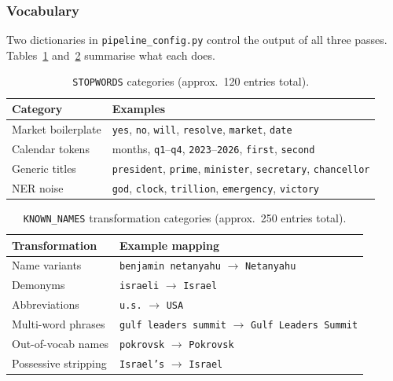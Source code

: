 \documentclass[11pt]{article}
\begin{document}
\subsubsection*{Vocabulary}

Two dictionaries in \texttt{pipeline\_config.py} control the output
of all three passes. Tables~\ref{tab:stopwords}
and~\ref{tab:known_names} summarise what each does.

\begin{table}[H]
\centering
\caption{\texttt{STOPWORDS} categories (approx.\ 120 entries total).}
\label{tab:stopwords}
\small
\begin{tabularx}{\textwidth}{l X}
\toprule
\textbf{Category} & \textbf{Examples} \\
\midrule
Market boilerplate & \texttt{yes}, \texttt{no}, \texttt{will},
                     \texttt{resolve}, \texttt{market}, \texttt{date} \\
Calendar tokens    & months, \texttt{q1}–\texttt{q4},
                     \texttt{2023}–\texttt{2026}, \texttt{first},
                     \texttt{second} \\
Generic titles     & \texttt{president}, \texttt{prime},
                     \texttt{minister}, \texttt{secretary},
                     \texttt{chancellor} \\
NER noise          & \texttt{god}, \texttt{clock}, \texttt{trillion},
                     \texttt{emergency}, \texttt{victory} \\
\bottomrule
\end{tabularx}
\end{table}

\begin{table}[H]
\centering
\caption{\texttt{KNOWN\_NAMES} transformation categories
         (approx.\ 250 entries total).}
\label{tab:known_names}
\small
\begin{tabularx}{\textwidth}{l X}
\toprule
\textbf{Transformation} & \textbf{Example mapping} \\
\midrule
Name variants       & \texttt{benjamin netanyahu} $\rightarrow$ \texttt{Netanyahu} \\
Demonyms            & \texttt{israeli}            $\rightarrow$ \texttt{Israel}    \\
Abbreviations       & \texttt{u.s.}               $\rightarrow$ \texttt{USA}       \\
Multi-word phrases  & \texttt{gulf leaders summit} $\rightarrow$ \texttt{Gulf Leaders Summit} \\
Out-of-vocab names  & \texttt{pokrovsk}           $\rightarrow$ \texttt{Pokrovsk}  \\
Possessive stripping & \texttt{Israel's}          $\rightarrow$ \texttt{Israel}   \\
\bottomrule
\end{tabularx}
\end{table}
\end{document}
